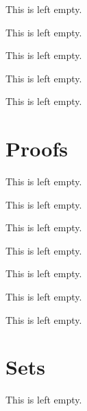 \begin{definition}
    This is left empty.
\end{definition}

\begin{example}
    This is left empty.
\end{example}

\begin{remark}
    This is left empty.
\end{remark}

\begin{example}
    This is left empty.
\end{example}

\begin{definition}
    This is left empty.
\end{definition}

\section{Proofs}

\begin{conjecture}
    This is left empty.
\end{conjecture}

\begin{proposition}
    This is left empty.
\end{proposition}

\begin{remark}
    This is left empty.
\end{remark}

\begin{definition}
    This is left empty.
\end{definition}

\begin{remark}
    This is left empty.
\end{remark}

\begin{proposition}
    This is left empty.
\end{proposition}

\begin{remark}
    This is left empty.
\end{remark}

\section{Sets}

\begin{definition}
    This is left empty.
\end{definition}

